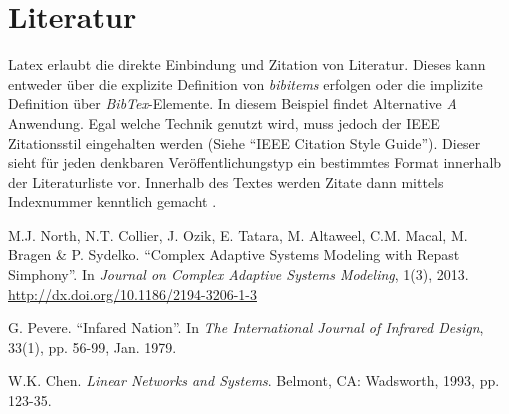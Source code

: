 \section{Literatur}
Latex erlaubt die direkte Einbindung und Zitation von Literatur. Dieses kann entweder über die explizite Definition von \textit{bibitems} erfolgen oder die implizite Definition über \textit{BibTex}-Elemente. In diesem Beispiel findet Alternative \textit{A} Anwendung. Egal welche Technik genutzt wird, muss jedoch der IEEE Zitationsstil eingehalten werden (Siehe ``IEEE Citation Style Guide''). Dieser sieht für jeden denkbaren Veröffentlichungstyp ein bestimmtes Format innerhalb der Literaturliste vor. Innerhalb des Textes werden Zitate dann mittels Indexnummer kenntlich gemacht \cite{Chen1993}.

\begin{thebibliography}{1}


M.J. North, N.T. Collier, J. Ozik, E. Tatara, M. Altaweel, C.M. Macal, M. Bragen \& P.  Sydelko. ``Complex Adaptive Systems Modeling with Repast Simphony''. In \textit{Journal on Complex Adaptive Systems Modeling}, 1(3), 2013. \href{http://dx.doi.org/10.1186/2194-3206-1-3}{http://dx.doi.org/10.1186/2194-3206-1-3}

G. Pevere. ``Infared Nation''. In \textit{The International Journal of Infrared Design}, 33(1), pp. 56-99, Jan. 1979.

W.K. Chen. \textit{Linear Networks and Systems}. Belmont, CA: Wadsworth, 1993, pp. 123-35.
\end{thebibliography}


